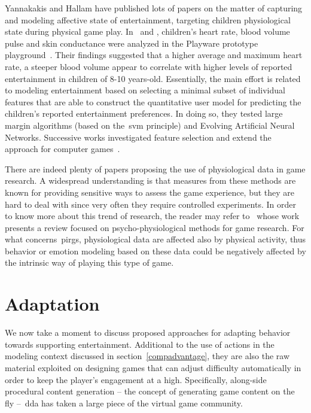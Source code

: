 Yannakakis and Hallam have published lots of papers on the matter of capturing and modeling affective state of entertainment, targeting children physiological state during physical game play. In~\cite{yannakakis_modeling_2006} and \cite{yannakakis_entertainment_2008}, children's heart rate, blood volume pulse and skin conductance were analyzed in the Playware prototype playground~\citep{lund_playware_2005}. Their findings suggested that a higher average and maximum heart rate, a steeper blood volume appear to correlate with higher levels of reported entertainment in children of 8-10 years-old. Essentially, the main effort is related to modeling entertainment based on selecting a minimal subset of individual features that are able to construct the quantitative user model for predicting the children's reported entertainment preferences. In doing so, they tested large margin algorithms (based on the~\gls{svm} principle) and Evolving Artificial Neural Networks. Successive works investigated feature selection and extend the approach for computer games~\citep{yannakakis_towards_2006,yannakakis_entertainment_2007,yannakakis_feature_2007,yannakakis_entertainment_2008-1}. 

There are indeed plenty of papers proposing the use of physiological data in game research. A widespread understanding is that measures from these methods are known for providing sensitive ways to assess the game experience, but they are hard to deal with since very often they require controlled experiments. In order to know more about this trend of research, the reader may refer to~\cite{kivikangas_review_2011} whose work presents a review focused on psycho-physiological methods for game research. For what concerns~\glspl{pirg}, physiological data are affected also by physical activity, thus behavior or emotion modeling based on these data could be negatively affected by the intrinsic way of playing this type of game.   

\section{Adaptation}
We now take a moment to discuss proposed approaches for adapting behavior towards supporting entertainment. Additional to the use of actions in the modeling context discussed in section~\ref{compadvantage}, they are also the raw material exploited on designing games that can adjust difficulty automatically in order to keep the player's engagement at a high. Specifically, along-side procedural content generation -- the concept of generating game content on the fly --~\gls{dda} has taken a large piece of the virtual game community.

